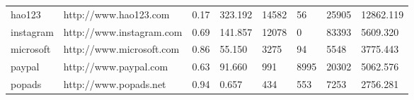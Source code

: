 \begin{table}[]
{\begin{tabular}{|l|l|l|l|l|l|l|l|}
hao123            & http://www.hao123.com      & 0.17                                                                                & 323.192                                                                           & 14582                                                          & 56                                                            & 25905                                                                & 12862.119                                                                      \\
\rowcolor[HTML]{EFEFEF} 
instagram         & http://www.instagram.com   & 0.69                                                                                & 141.857                                                                           & 12078                                                          & 0                                                             & 83393                                                                & 5609.320                                                                       \\
microsoft         & http://www.microsoft.com   & 0.86                                                                                & 55.150                                                                            & 3275                                                           & 94                                                            & 5548                                                                 & 3775.443                                                                       \\
\rowcolor[HTML]{EFEFEF} 
paypal            & http://www.paypal.com      & 0.63                                                                                & 91.660                                                                            & 991                                                            & 8995                                                          & 20302                                                                & 5062.576                                                                       \\
popads            & http://www.popads.net      & 0.94                                                                                & 0.657                                                                             & 434                                                            & 553                                                           & 7253                                                                 & 2756.281                                                                       \\

\end{tabular}}
\end{table}
